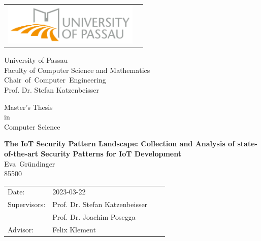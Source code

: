 \documentclass[fontsize=10pt,openright,oneside,paper=a4,BCOR=1cm,numbers=noenddot]{scrbook}
\newcommand{\authornamefirst}{Eva}
\newcommand{\authornamelast}{Gründinger}
\newcommand{\matrikelnummer}{85500}
\newcommand{\worktitle}{The IoT Security Pattern Landscape: Collection and Analysis of state-of-the-art Security Patterns for IoT Development}
\newcommand{\thesistype}{Master's Thesis}
\newcommand{\courseofstudies}{Computer Science}
\newcommand{\thesisdate}{2023-03-22}   %
\newcommand{\thesisprof}{Prof. Dr. Stefan Katzenbeisser}
\newcommand{\thesisproftwo}{Prof. Dr. Joachim Posegga}
\newcommand{\chair}{\mbox{Chair of Computer Engineering}}
\newcommand{\advisor}{Felix Klement}
\begin{document}
\frontmatter
\thispagestyle{empty}
\newpage

\vspace{1cm}

\begin{center}
\begin{tabular}{lr}
\includegraphics[width=6.5cm]{img/logouni_en.png}
\end{tabular}

\vspace{3cm}
\Large University of Passau
\\
\Large Faculty of Computer Science and Mathematics
\\
\vspace{0.3cm}
\Large {\chair }
\\
\Large \thesisprof

\end{center}


\vspace{2.5cm}

\begin{center}
        {\Large \thesistype\\ in \\ \courseofstudies} 
\end{center}

\begin{center}
        \settowidth{\baselineskip}{0.4cm}
        {\LARGE \textbf{\worktitle}}
        \\
        {\Large
        \vspace{1cm}
        \authornamefirst~\authornamelast \\ \matrikelnummer \\
        }
\end{center}

\vfill {%

\vfill


{\large
\begin{tabular}[l]{llll}

Date:       & \thesisdate %
\smallskip \\
Supervisors:   & \thesisprof \\
	& \thesisproftwo \\
Advisor: & \advisor \\
\end{tabular}}
} \cleardoublepage
\end{document}
